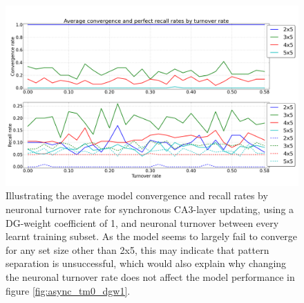 \begin{figure}
    \centering
    \includegraphics[width=13cm]{fig/turnover_rates/sync_tm0_dgw1}
    \caption{Illustrating the average model convergence and recall rates by neuronal turnover rate for synchronous CA3-layer updating, using a DG-weight coefficient of 1, and neuronal turnover between every learnt training subset. As the model seems to largely fail to converge for any set size other than 2x5, this may indicate that pattern separation is unsuccessful, which would also explain why changing the neuronal turnover rate does not affect the model performance in figure \ref{fig:async_tm0_dgw1}.}
    \label{fig:sync_tm0_dgw1}
\end{figure}

